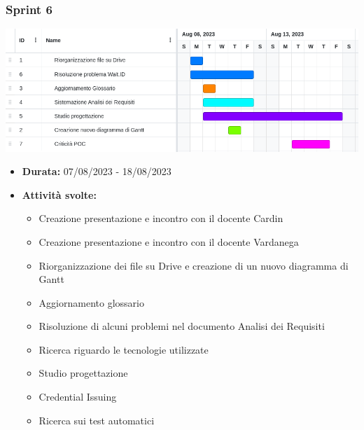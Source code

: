     \subsubsection{Sprint 6}
    \begin{center}
        \includegraphics[scale = 0.5]{./res/img/Sprint 6.png}
      \end{center}
    \begin{itemize}
        \item \textbf{Durata:} 07/08/2023 - 18/08/2023 
        \item \textbf{Attività svolte:}
        \begin{itemize}
            \item Creazione presentazione e incontro con il docente Cardin
            \item Creazione presentazione e incontro con il docente Vardanega
            \item Riorganizzazione dei file su Drive e creazione di un nuovo diagramma di Gantt
            \item Aggiornamento glossario
            \item Risoluzione di alcuni problemi nel documento Analisi dei Requisiti
            \item Ricerca riguardo le tecnologie utilizzate
            \item Studio progettazione
            \item Credential Issuing
            \item Ricerca sui test automatici
            

\end{itemize}
\end{itemize}
